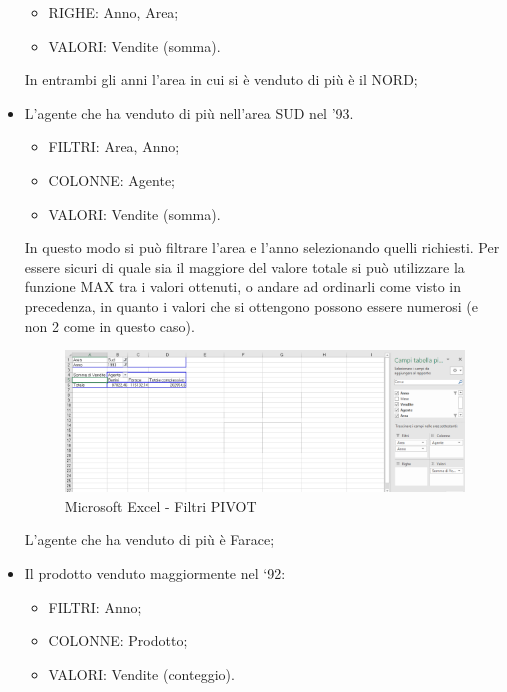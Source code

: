 \begin{itemize}
\begin{itemize}
\item{RIGHE}: Anno, Area;
\item{VALORI}: Vendite (somma).
\end{itemize}

In entrambi gli anni l’area in cui si è venduto di più è il NORD;  

\item L’agente che ha venduto di più nell’area SUD nel ’93.

\begin{itemize}
\item{FILTRI}: Area, Anno;
\item{COLONNE}: Agente;
\item{VALORI}: Vendite (somma).
\end{itemize}

In questo modo si può filtrare l’area e l’anno selezionando quelli richiesti. Per essere sicuri di quale sia il maggiore del valore totale si può utilizzare la funzione MAX tra i valori ottenuti, o andare ad ordinarli come visto in precedenza, in quanto i valori che si ottengono possono essere numerosi (e non 2 come in questo caso).  

\begin{center}
\begin{figure}[H]
\centering
\includegraphics[scale=0.8]{figures/excel_pivotfilters.png}
\caption{Microsoft Excel - Filtri PIVOT}
\end{figure}
\end{center}

L’agente che ha venduto di più è Farace;

\item Il prodotto venduto maggiormente nel ‘92:

\begin{itemize}
\item{FILTRI}: Anno;
\item{COLONNE}: Prodotto;
\item{VALORI}: Vendite (conteggio).
\end{itemize}


\end{itemize}
